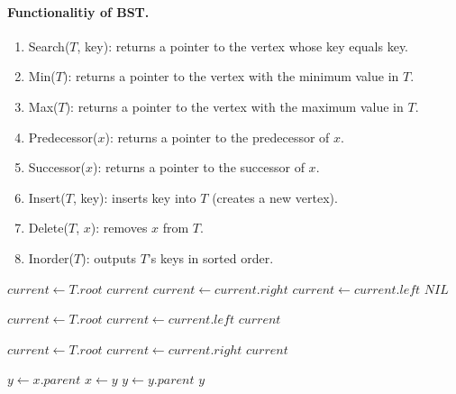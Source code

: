 \paragraph{Functionalitiy of BST.}
\begin{enumerate}
\item Search($T$, key): returns a pointer to the vertex whose key equals key. 
  \item Min($T$): returns a pointer to the vertex with the minimum value in $T$.  
  \item Max($T$): returns a pointer to the vertex with the maximum value in $T$.  
  \item Predecessor($x$): returns a pointer to the predecessor of $x$.  
  \item Successor($x$): returns a pointer to the successor of $x$. 
  \item Insert($T$, key): inserts key into $T$ (creates a new vertex).   
  \item Delete($T$, $x$): removes $x$ from $T$. 
  \item Inorder($T$): outputs $T$'s keys in sorted order.
\end{enumerate}
\begin{algorithmic}
    \State $current \gets T.root$
            \State \Return $current$
            \State $current \gets current.right$
        \Else
            \State $current \gets current.left$
        \EndIf
    \EndWhile
    \State \Return $NIL$
\EndFunction
\end{algorithmic}

\begin{algorithmic}
    \State $current \gets T.root$
        \State $current \gets current.left$
    \EndWhile
    \State \Return $current$
\EndFunction
\end{algorithmic}

\begin{algorithmic}
    \State $current \gets T.root$
        \State $current \gets current.right$
    \EndWhile
    \State \Return $current$
\EndFunction
\end{algorithmic}

\begin{algorithmic}
        \State \Return {}
    \EndIf
    \State $y \gets x.parent$
        \State $x \gets y$
        \State $y \gets y.parent$
    \EndWhile
    \State \Return $y$
\EndFunction
\end{algorithmic}

